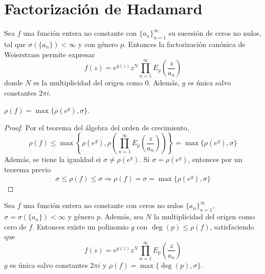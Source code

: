 \section{Factorización de Hadamard}
Sea $f$ una función entera no constante con $\{a_n\}_{n=1}^\infty$ su sucesión de ceros no nulos, tal que $\sigma(\{a_n\}) < \infty$ y con género $p$.
Entonces la factorización canónica de Weierstrass permite expresar
$$f(z) = e^{g(z)}z^N \prod_{n=1}^\infty E_p\left(\frac{z}{a_n}\right)$$
donde $N$ es la multiplicidad del origen como 0.
Además, $g$ es única salvo constantes $2\pi i$.

\begin{proposition}
    $\rho(f) = \max\{\rho(e^g), \sigma\}$.
\end{proposition}

\begin{proof}
    Por el teorema del álgebra del orden de crecimiento,
    $$\rho(f) \leq \max\left\{\rho(e^g), \rho\left(\prod_{n=1}^\infty E_p\left(\frac{z}{a_n}\right)\right)\right\} = \max\{\rho(e^g), \sigma\}$$
    Además, se tiene la igualdad si $\sigma \neq \rho(e^g)$.
    Si $\sigma = \rho(e^g)$, entonces por un teorema previo
    $$\sigma \leq \rho(f) \leq \sigma \Rightarrow \rho(f) = \sigma = \max\{\rho(e^g), \sigma\}$$
\end{proof}

\begin{theorem}
    Sea $f$ una función entera no constante con ceros no nulos $\{a_n\}_{n=1}^\infty$, $\sigma = \sigma(\{a_n\}) < \infty$ y género $p$.
    Además, sea $N$ la multiplicidad del origen como cero de $f$.
    Entonces existe un polinomio $g$ con $\deg(p) \leq \rho(f)$, satisfaciendo que
    $$f(z) = e^{g(z)}z^N \prod_{n=1}^\infty E_p\left(\frac{z}{a_n}\right)$$
    $g$ es única salvo constantes $2\pi i$ y $\rho(f) = \max\{\deg(p), \sigma\}$.
\end{theorem}

